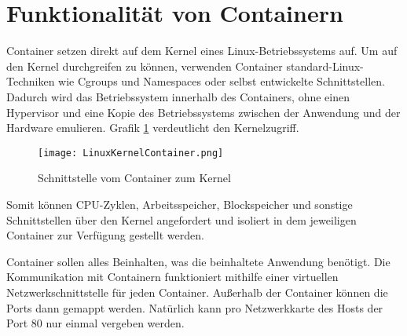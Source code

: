 \section{Funktionalität von Containern}
\label{sec:Funktionalität von Container}
Container setzen direkt auf dem Kernel eines Linux-Betriebssystems auf. Um auf den Kernel durchgreifen zu können, verwenden Container standard-Linux-Techniken wie Cgroups und Namespaces oder selbst entwickelte Schnittstellen. Dadurch wird das Betriebssystem innerhalb des Containers, ohne einen Hypervisor und eine Kopie des Betriebssystems zwischen der Anwendung und der Hardware emulieren.\cite{10228802020150501} Grafik \ref{fig:HW1} verdeutlicht den Kernelzugriff.
\begin{figure}[H]
	\begin{center}
		\texttt{[image: LinuxKernelContainer.png]}
	\end{center}
	\caption[Schnittstelle vom Container zum Kernel]{Schnittstelle vom Container zum Kernel \footnotemark}
	\label{fig:HW1}
\end{figure}
Somit können CPU-Zyklen, Arbeitsspeicher, Blockspeicher und sonstige Schnittstellen über den Kernel angefordert und isoliert in dem jeweiligen Container zur Verfügung gestellt werden.\cite{12059254020170101}

Container sollen alles Beinhalten, was die beinhaltete Anwendung benötigt.
Die Kommunikation mit Containern funktioniert mithilfe einer virtuellen Netzwerkschnittstelle für jeden Container. Außerhalb der Container können die Ports dann gemappt werden. Natürlich kann pro Netzwerkkarte des Hosts der Port 80 nur einmal vergeben werden.\cite{10228802020150501}

